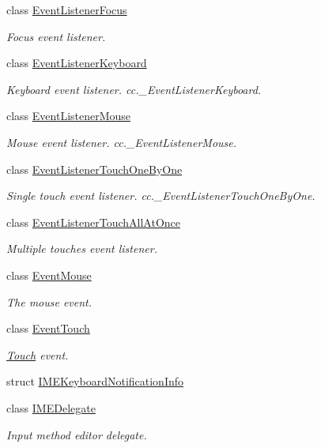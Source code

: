 \begin{DoxyCompactItemize}
class \hyperlink{classEventListenerFocus}{Event\+Listener\+Focus}
\begin{DoxyCompactList}\small\item\em Focus event listener. \end{DoxyCompactList}\item 
class \hyperlink{classEventListenerKeyboard}{Event\+Listener\+Keyboard}
\begin{DoxyCompactList}\small\item\em Keyboard event listener.  cc.\+\_\+\+Event\+Listener\+Keyboard. \end{DoxyCompactList}\item 
class \hyperlink{classEventListenerMouse}{Event\+Listener\+Mouse}
\begin{DoxyCompactList}\small\item\em Mouse event listener.  cc.\+\_\+\+Event\+Listener\+Mouse. \end{DoxyCompactList}\item 
class \hyperlink{classEventListenerTouchOneByOne}{Event\+Listener\+Touch\+One\+By\+One}
\begin{DoxyCompactList}\small\item\em Single touch event listener.  cc.\+\_\+\+Event\+Listener\+Touch\+One\+By\+One. \end{DoxyCompactList}\item 
class \hyperlink{classEventListenerTouchAllAtOnce}{Event\+Listener\+Touch\+All\+At\+Once}
\begin{DoxyCompactList}\small\item\em Multiple touches event listener. \end{DoxyCompactList}\item 
class \hyperlink{classEventMouse}{Event\+Mouse}
\begin{DoxyCompactList}\small\item\em The mouse event. \end{DoxyCompactList}\item 
class \hyperlink{classEventTouch}{Event\+Touch}
\begin{DoxyCompactList}\small\item\em \hyperlink{classTouch}{Touch} event. \end{DoxyCompactList}\item 
struct \hyperlink{structIMEKeyboardNotificationInfo}{I\+M\+E\+Keyboard\+Notification\+Info}
\item 
class \hyperlink{classIMEDelegate}{I\+M\+E\+Delegate}
\begin{DoxyCompactList}\small\item\em Input method editor delegate. \end{DoxyCompactList}\item 

\end{DoxyCompactItemize}
